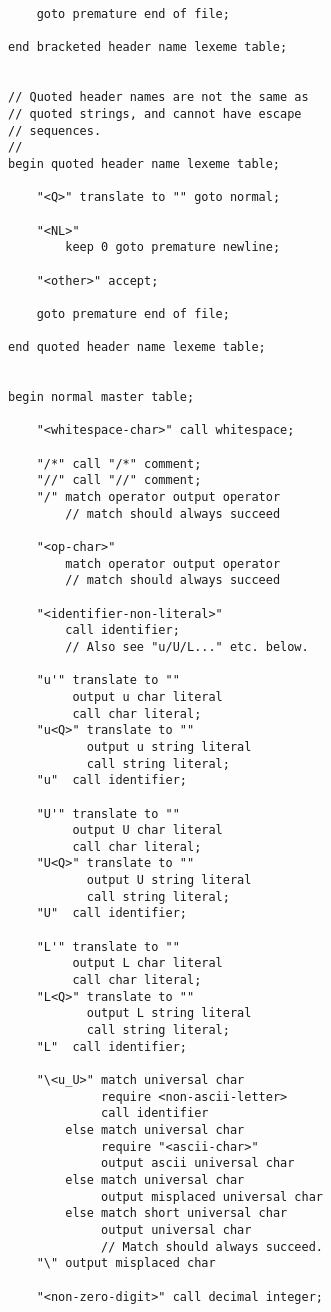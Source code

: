 \documentclass[12pt]{article}
\newenvironment{indpar}[1][0.3in]%
	{\begin{list}{}%
		     {\setlength{\itemsep}{0in}%
		      \setlength{\topsep}{0in}%
		      \setlength{\parsep}{1ex}%
		      \setlength{\labelwidth}{#1}%
		      \setlength{\leftmargin}{#1}%
		      \addtolength{\leftmargin}{\labelsep}}%
	 \item}%
	{\end{list}}
\begin{document}
\begin{indpar}
\begin{verbatim}
    goto premature end of file;

end bracketed header name lexeme table;


// Quoted header names are not the same as
// quoted strings, and cannot have escape
// sequences.
//
begin quoted header name lexeme table;

    "<Q>" translate to "" goto normal;

    "<NL>"
        keep 0 goto premature newline;

    "<other>" accept;

    goto premature end of file;

end quoted header name lexeme table;


begin normal master table;

    "<whitespace-char>" call whitespace;

    "/*" call "/*" comment;
    "//" call "//" comment;
    "/" match operator output operator
        // match should always succeed

    "<op-char>"
        match operator output operator
        // match should always succeed

    "<identifier-non-literal>"
        call identifier;
        // Also see "u/U/L..." etc. below.

    "u'" translate to ""
         output u char literal
         call char literal;
    "u<Q>" translate to ""
           output u string literal
           call string literal;
    "u"  call identifier;

    "U'" translate to ""
         output U char literal
         call char literal;
    "U<Q>" translate to ""
           output U string literal
           call string literal;
    "U"  call identifier;

    "L'" translate to ""
         output L char literal
         call char literal;
    "L<Q>" translate to ""
           output L string literal
           call string literal;
    "L"  call identifier;

    "\<u_U>" match universal char
             require <non-ascii-letter>
             call identifier
        else match universal char
             require "<ascii-char>"
             output ascii universal char
        else match universal char
             output misplaced universal char
        else match short universal char
             output universal char
             // Match should always succeed.
    "\" output misplaced char

    "<non-zero-digit>" call decimal integer;


\end{verbatim}
\end{indpar}
\end{document}
